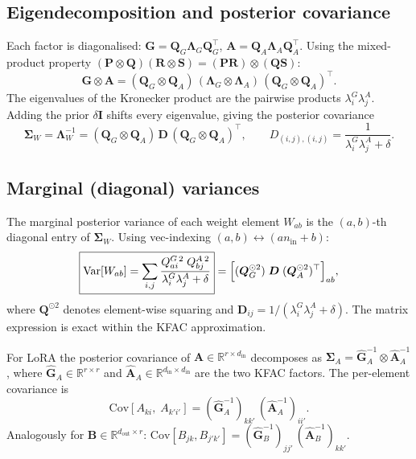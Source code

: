 \documentclass[11pt]{article}
\newcommand{\R}{\mathbb{R}}
\newcommand{\Var}{\mathrm{Var}}
\newcommand{\Cov}{\mathrm{Cov}}
\newcommand{\kron}{\otimes}
\begin{document}
\subsection{Eigendecomposition and posterior covariance}
\label{sec:eigen}

Each factor is diagonalised:
$\bm G = \bm Q_G \bm\Lambda_G \bm Q_G^\top$,
$\bm A = \bm Q_A \bm\Lambda_A \bm Q_A^\top$.
Using the mixed-product property $(\bm P \kron \bm Q)(\bm R \kron \bm S)
= (\bm P\bm R)\kron(\bm Q\bm S)$:
\begin{equation}
  \bm G \kron \bm A = (\bm Q_G \kron \bm Q_A)\,
  (\bm\Lambda_G \kron \bm\Lambda_A)\,
  (\bm Q_G \kron \bm Q_A)^\top.
\end{equation}
The eigenvalues of the Kronecker product are the pairwise products
$\lambda^G_i \lambda^A_j$. Adding the prior $\delta \bm I$ shifts every
eigenvalue, giving the posterior covariance
\begin{equation}
  \bm\Sigma_W = \bm\Lambda_W^{-1} =
  (\bm Q_G \kron \bm Q_A)\,
  \bm D\,
  (\bm Q_G \kron \bm Q_A)^\top, \qquad
  D_{(i,j),(i,j)} = \frac{1}{\lambda^G_i \lambda^A_j + \delta}.
\end{equation}

\subsection{Marginal (diagonal) variances}

The marginal posterior variance of each weight element $W_{ab}$ is the
$(a,b)$-th diagonal entry of $\bm\Sigma_W$.
Using vec-indexing $(a,b) \leftrightarrow (a n_\text{in} + b)$:
\begin{equation}
  \boxed{
    \Var[W_{ab}] = \sum_{i,j}
    \frac{Q^G_{ai}{}^2\; Q^A_{bj}{}^2}{\lambda^G_i \lambda^A_j + \delta}
  }
  = \Bigl[(\bm Q_G^{\odot 2})\;\bm D\;(\bm Q_A^{\odot 2})^\top\Bigr]_{ab},
  \label{eq:diagvar}
\end{equation}
where $\bm Q^{\odot 2}$ denotes element-wise squaring and
$\bm D_{ij} = 1/(\lambda^G_i \lambda^A_j + \delta)$.
The matrix expression is exact within the KFAC approximation.

For LoRA the posterior covariance of $\bm A \in \R^{r \times d_\text{in}}$
decomposes as
$\bm\Sigma_A = \hat{\bm G}_A^{-1} \kron \hat{\bm A}_A^{-1}$, where
$\hat{\bm G}_A \in \R^{r \times r}$ and
$\hat{\bm A}_A \in \R^{d_\text{in} \times d_\text{in}}$
are the two KFAC factors.
The per-element covariance is
\begin{equation}
  \Cov[A_{ki},\; A_{k'i'}] =
  (\hat{\bm G}_A^{-1})_{kk'}\,(\hat{\bm A}_A^{-1})_{ii'}.
\end{equation}
Analogously for $\bm B \in \R^{d_\text{out} \times r}$:
$\Cov[B_{jk}, B_{j'k'}] = (\hat{\bm G}_B^{-1})_{jj'}\,(\hat{\bm A}_B^{-1})_{kk'}$.
\end{document}
